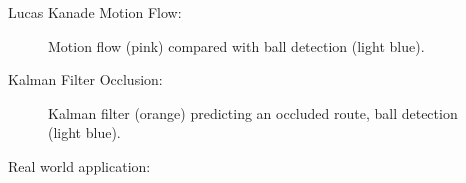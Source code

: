 \documentclass{sciposter}
\begin{document}
\begin{multicols}{3}
Lucas Kanade Motion Flow:

\begin{figure}[!h]
	\centering
			\setlength{\fboxsep}{1pt}
			\setlength{\fboxrule}{1pt}
	\caption{Motion flow (pink) compared with ball detection (light blue).}
	\label{fig:motion}
\end{figure}

Kalman Filter Occlusion:

\begin{figure}[!h]
	\centering
			\setlength{\fboxsep}{1pt}
			\setlength{\fboxrule}{1pt}
	\caption{Kalman filter (orange) predicting an occluded route, ball detection (light blue).}
	\label{fig:occlusion}
\end{figure}

Real world application:


\end{multicols}
\end{document}
